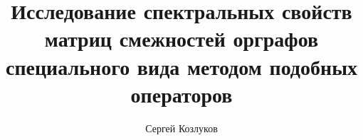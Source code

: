 \documentclass[11pt,a4paper,twoside]{article}
\title{Исследование спектральных свойств матриц
смежностей орграфов специального вида
методом подобных операторов}
\author{Сергей Козлуков}
\begin{document}
\maketitle
\begin{abstract}
    
\end{abstract}


\printbibliography
\end{document}

